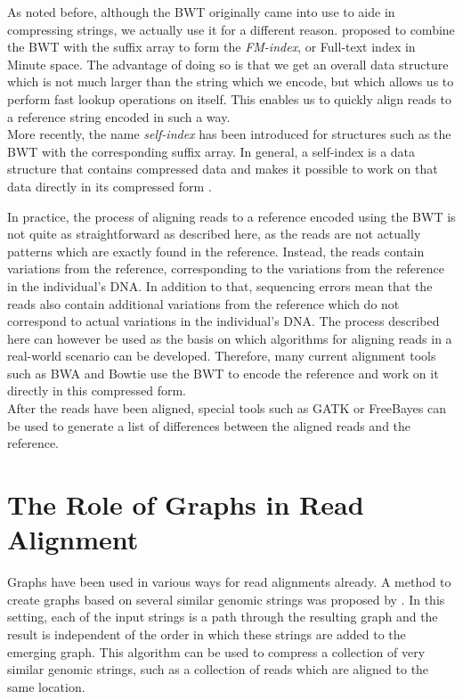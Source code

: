 \documentclass[a4paper,12pt,twoside,BCOR=10mm]{scrbook}
\begin{document}
As noted before, although the BWT originally came into use to aide in compressing strings,
we actually use it for a different reason.
\citet{Ferragina2000} proposed to combine the BWT with the suffix array
to form the \textit{FM-index}, or Full-text index in Minute space.
The advantage of doing so is that we get an overall data structure which is not much larger
than the string which we encode, but which allows us to perform fast lookup operations
on itself.
This enables us to quickly align reads to a reference string encoded in such a way. \\
More recently, the name \textit{self-index} has been
introduced for structures such as the BWT with the corresponding suffix array.
In general, a self-index is a data structure that contains compressed data and makes it possible
to work on that data directly in its compressed form \citep{Navarro2007}.

In practice, the process of aligning reads to a reference encoded using the BWT
is not quite as straightforward as described here,
as the reads are not actually patterns which are exactly found in the reference.
Instead, the reads contain variations from the reference, corresponding to the
variations from the reference in the individual's DNA.
In addition to that, sequencing errors mean that the reads also contain additional variations
from the reference which do not correspond to actual variations in the individual's DNA.
The process described here can however be used as the basis on which
algorithms for aligning reads in a real-world scenario can be developed.
Therefore, many current alignment tools such as BWA \citep{Li2009} and Bowtie \citep{Langmead2009} use
the BWT to encode the reference and work on it directly in this compressed form. \\
After the reads have been aligned, special tools such as
GATK \citep{McKenna2010} or FreeBayes \citep{Garrison2012} can
be used to generate a list of differences between the aligned reads
and the reference.

\section{The Role of Graphs in Read Alignment}

Graphs have been used in various ways for read alignments already.
A method to create graphs based on several similar genomic strings
was proposed by \citet{Lee2002}.
In this setting, each of the input strings is a path through the resulting graph and
the result is independent of the order in which these strings
are added to the emerging graph.
This algorithm can be used to compress a collection of very similar genomic strings,
such as a collection of reads which are aligned to the same location.
\end{document}
